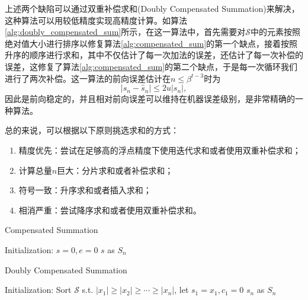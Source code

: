 \documentclass[a4paper,10pt]{ctexart}
\begin{document}
上述两个缺陷可以通过双重补偿求和(Doubly Compensated Summation)来解决，这种算法可以用较低精度实现高精度计算。如算法\ref{alg:doubly_compensated_sum}所示，在这一算法中，首先需要对$ \mathcal{S} $中的元素按照绝对值大小进行排序以修复算法\ref{alg:compensated_sum}的第一个缺点，接着按照升序的顺序进行求和，其中不仅估计了每一次加法的误差，还估计了每一次补偿的误差，这修复了算法\ref{alg:compensated_sum}的第二个缺点，于是每一次循环我们进行了两次补偿。这一算法的前向误差估计在$ n\leqslant \beta^{t-3} $时为
\begin{equation}
    |s_n - \hat{s}_n |\leqslant 2u|s_n|,
\end{equation}
因此是前向稳定的，并且相对前向误差可以维持在机器误差级别，是非常精确的一种算法。

总的来说，可以根据以下原则挑选求和的方式：
\begin{enumerate}
    \item 精度优先：尝试在足够高的浮点精度下使用迭代求和或者使用双重补偿求和；
    \item 计算总量$ n $巨大：分片求和或者补偿求和；
    \item 符号一致：升序求和或者插入求和；
    \item 相消严重：尝试降序求和或者使用双重补偿求和。
\end{enumerate}

\begin{algorithm}[htbp]
    \caption{Compensated Summation}\label{alg:compensated_sum}
    Initialization: $ s = 0, e=0 $\;
    \Return $ s $ as $ S_n $\;
\end{algorithm}

\begin{algorithm}[htbp]
    \caption{Doubly Compensated Summation}\label{alg:doubly_compensated_sum}
    Initialization: Sort $ \mathcal{S} $ s.t. $ |x_1|\geqslant |x_2|\geqslant \cdots \geqslant |x_n| $, let $ s_1 = x_1, c_1=0 $\;
    \Return $ s_n $ as $ S_n $\;
\end{algorithm}
\end{document}
